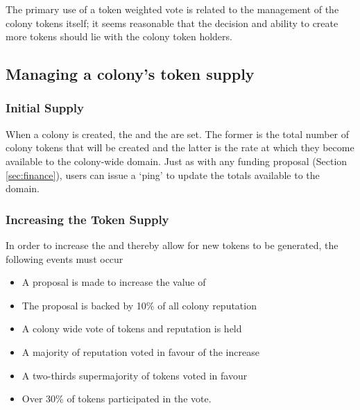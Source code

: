 The primary use of a token weighted vote is related to the management of the colony tokens itself; it seems reasonable that the decision and ability to create more tokens should lie with the colony token holders.

 
\subsection{Managing a colony's token supply}\label{sec:colony-token-managements}
\subsubsection{Initial Supply}
When a colony is created, the  and the  are set. The former is the total number of colony tokens that will be created and the latter is the rate at which they become available to the colony-wide domain. Just as with any funding proposal (Section \ref{sec:finance}), users can issue a `ping' to update the totals available to the domain.

\subsubsection{Increasing the Token Supply}
In order to increase the  and thereby allow for new tokens to be generated, the following events must occur
\begin{itemize}
 \item A proposal is made to increase the value of 
 \item The proposal is backed by 10\% of all colony reputation
 \item A colony wide vote of tokens and reputation is held
 \item A majority of reputation voted in favour of the increase
 \item A two-thirds supermajority of tokens voted in favour
 \item Over 30\% of tokens participated in the vote.
\end{itemize}

